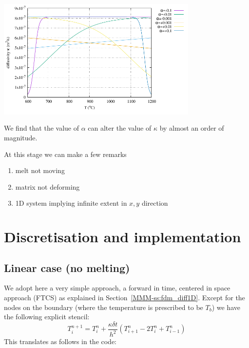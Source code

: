 \begin{center}
\includegraphics[width=10cm]{python_codes/fieldstone_169/images/kappa.pdf}
\end{center}
We find that the value of $\alpha$ can alter the value of $\kappa$ by almost an order of magnitude.

At this stage we can make a few remarks
\begin{enumerate}
\item melt not moving
\item matrix not deforming
\item 1D system implying infinite extent in $x,y$ direction
\end{enumerate}


\section*{Discretisation and implementation}

\subsection*{Linear case (no melting)}

We adopt here a very simple approach, a forward in time, 
centered in space approach (FTCS) as explained in Section~\ref{MMM-ss:fdm_diff1D}. 
Except for the nodes on the boundary (where the temperature
is prescribed to be $T_b$) we have the following explicit stencil:
\[
T_i^{n+1} 
= 
T_i^n + \frac{\kappa \delta t }{h^2} (T_{i+1}^n-2T_i^n+T_{i-1}^n)
\]
This translates as follows in the code:


